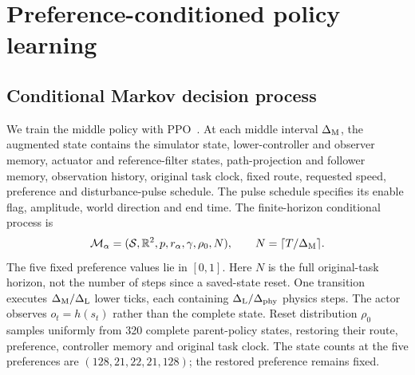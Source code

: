 \section{Preference-conditioned policy learning}
\label{sec:learning}
\subsection{Conditional Markov decision process}
We train the middle policy with PPO~\cite{schulman2017}. At each middle interval $\Delta_{\rm M}$, the augmented state contains the simulator state, lower-controller and observer memory, actuator and reference-filter states, path-projection and follower memory, observation history, original task clock, fixed route, requested speed, preference and disturbance-pulse schedule. The pulse schedule specifies its enable flag, amplitude, world direction and end time. The finite-horizon conditional process is
\begin{equation}
\mathcal M_\alpha=(\mathcal S,\mathbb R^2,p,r_\alpha,\gamma,\rho_0,N),
\qquad N=\lceil T/\Delta_{\rm M}\rceil.
\label{eq:mdp}
\end{equation}
The five fixed preference values lie in $[0,1]$. Here $N$ is the full original-task horizon, not the number of steps since a saved-state reset. One transition executes $\Delta_{\rm M}/\Delta_{\rm L}$ lower ticks, each containing $\Delta_{\rm L}/\Delta_{\rm phy}$ physics steps. The actor observes $o_t=h(s_t)$ rather than the complete state. Reset distribution $\rho_0$ samples uniformly from 320 complete parent-policy states, restoring their route, preference, controller memory and original task clock. The state counts at the five preferences are $(128,21,22,21,128)$; the restored preference remains fixed.

